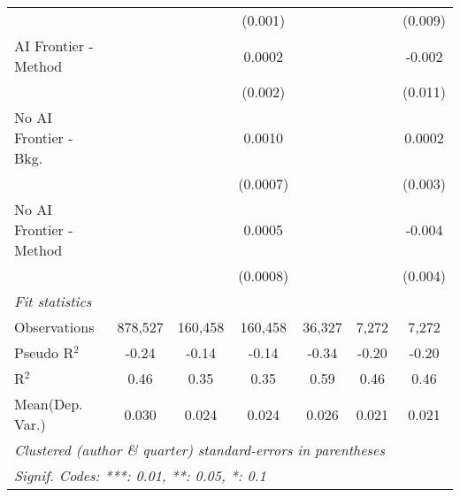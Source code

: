 \begin{tabular}{lcccccc}
                           &               &              & (0.001)       &              &         & (0.009)\\   
   AI Frontier - Method    &               &              & 0.0002        &              &         & -0.002\\   
                           &               &              & (0.002)       &              &         & (0.011)\\   
   No AI Frontier - Bkg.   &               &              & 0.0010        &              &         & 0.0002\\   
                           &               &              & (0.0007)      &              &         & (0.003)\\   
   No AI Frontier - Method &               &              & 0.0005        &              &         & -0.004\\   
                           &               &              & (0.0008)      &              &         & (0.004)\\   
   \midrule
   \emph{Fit statistics}\\
   Observations            & 878,527       & 160,458      & 160,458       & 36,327       & 7,272   & 7,272\\  
   Pseudo R$^2$            & -0.24         & -0.14        & -0.14         & -0.34        & -0.20   & -0.20\\  
   R$^2$                   & 0.46          & 0.35         & 0.35          & 0.59         & 0.46    & 0.46\\  
Mean(Dep. Var.) & 0.030 & 0.024 & 0.024 & 0.026 & 0.021 & 0.021 \\
   \midrule \midrule
   \multicolumn{7}{l}{\emph{Clustered (author \& quarter) standard-errors in parentheses}}\\
   \multicolumn{7}{l}{\emph{Signif. Codes: ***: 0.01, **: 0.05, *: 0.1}}\\
\end{tabular}
\par\endgroup
